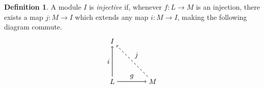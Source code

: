 \documentclass[11.5pt, twoside, a4paper, titlepage]{report}
\theoremstyle{definition}
\newtheorem{mydef}{Definition}[section]
\theoremstyle{plain}
\begin{document}
\begin{mydef}
A module $I$ is \emph{injective} if, whenever $f: L \to M$ is an injection, there exists a map $j: M \to I$ which extends any map $i: M \to I$, making the following diagram commute.
\begin{equation*}
\begin{tikzpicture}[->,-latex, auto, main path/.style={->, semithick}, main node/.style={}]
\node	[main node]		(1) at (0,0)		{$L$};
\node	[main node]		(2) at (2,0)		{$M$};
\node [main node]		(3) at (0,2)		{$I$};

\draw (1) edge [main path] node [auto] {$g$} (2);
\draw (1) edge [main path] node [auto] {$i$} (3);
\draw (2) edge [dashed, ->, semithick] node [auto, swap] {$j$} (3);
\end{tikzpicture}
\end{equation*}
\end{mydef}
\end{document}

